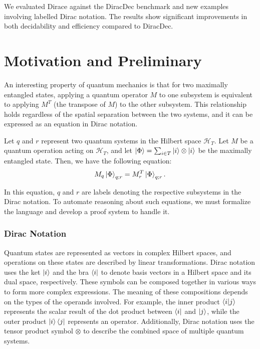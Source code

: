 \documentclass[runningheads]{llncs}
\begin{document}
We evaluated Dirace against the DiracDec benchmark and new examples involving labelled Dirac notation. The results show significant improvements in both decidability and efficiency compared to DiracDec.



\section{Motivation and Preliminary}

An interesting property of quantum mechanics is that for two maximally entangled states, applying a quantum operator \( M \) to one subsystem is equivalent to applying \( M^T \) (the transpose of \( M \)) to the other subsystem. This relationship holds regardless of the spatial separation between the two systems, and it can be expressed as an equation in Dirac notation.
\begin{example}
    \label{ex: motivating}
    Let \( q \) and \( r \) represent two quantum systems in the Hilbert space \( \mathcal{H}_T \). Let \( M \) be a quantum operation acting on \( \mathcal{H}_T \), and let \( \ket{\Phi} = \sum_{i \in T} \ket{i} \otimes \ket{i} \) be the maximally entangled state. Then, we have the following equation:
    \[
    M_q \ket{\Phi}_{q; r} = M_r^T \ket{\Phi}_{q; r}.
    \]
\end{example}

In this equation, \( q \) and \( r \) are labels denoting the respective subsystems in the Dirac notation. To automate reasoning about such equations, we must formalize the language and develop a proof system to handle it.

\subsubsection{Dirac Notation}

Quantum states are represented as vectors in complex Hilbert spaces, and operations on these states are described by linear transformations. Dirac notation uses the ket \( \ket{i} \) and the bra \( \bra{i} \) to denote basis vectors in a Hilbert space and its dual space, respectively. These symbols can be composed together in various ways to form more complex expressions. The meaning of these compositions depends on the types of the operands involved.
For example, the inner product \( \braket{i|j} \) represents the scalar result of the dot product between \( \bra{i} \) and \( \ket{j} \), while the outer product \( \ket{i}\bra{j} \) represents an operator. Additionally, Dirac notation uses the tensor product symbol \( \otimes \) to describe the combined space of multiple quantum systems.
\end{document}
